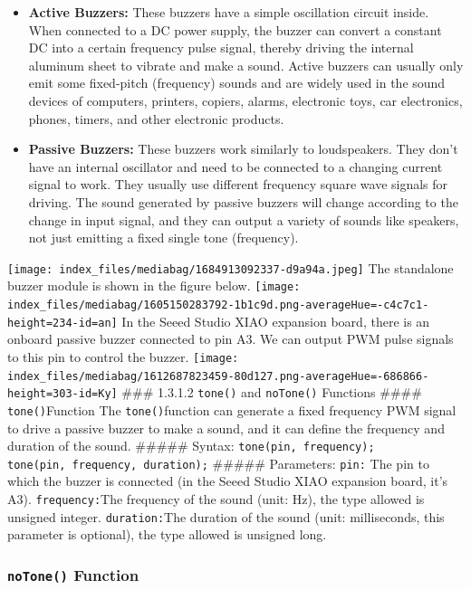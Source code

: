 \documentclass[
  letterpaper,
  DIV=11,
  numbers=noendperiod]{scrreprt}
\providecommand{\tightlist}{%
  \setlength{\itemsep}{0pt}\setlength{\parskip}{0pt}}\usepackage{longtable,booktabs,array}
\begin{document}
\begin{itemize}
\tightlist
\item
  \textbf{Active Buzzers:} These buzzers have a simple oscillation
  circuit inside. When connected to a DC power supply, the buzzer can
  convert a constant DC into a certain frequency pulse signal, thereby
  driving the internal aluminum sheet to vibrate and make a sound.
  Active buzzers can usually only emit some fixed-pitch (frequency)
  sounds and are widely used in the sound devices of computers,
  printers, copiers, alarms, electronic toys, car electronics, phones,
  timers, and other electronic products.
\item
  \textbf{Passive Buzzers:} These buzzers work similarly to
  loudspeakers. They don't have an internal oscillator and need to be
  connected to a changing current signal to work. They usually use
  different frequency square wave signals for driving. The sound
  generated by passive buzzers will change according to the change in
  input signal, and they can output a variety of sounds like speakers,
  not just emitting a fixed single tone (frequency).
\end{itemize}

\texttt{[image: index\_files/mediabag/1684913092337-d9a94a.jpeg]} The
standalone buzzer module is shown in the figure below.
\texttt{[image: index\_files/mediabag/1605150283792-1b1c9d.png-averageHue=-c4c7c1-height=234-id=an]}
In the Seeed Studio XIAO expansion board, there is an onboard passive
buzzer connected to pin A3. We can output PWM pulse signals to this pin
to control the buzzer.
\texttt{[image: index\_files/mediabag/1612687823459-80d127.png-averageHue=-686866-height=303-id=Ky]}
\#\#\# 1.3.1.2 \texttt{tone()} and \texttt{noTone()} Functions \#\#\#\#
\texttt{tone()}Function The \texttt{tone()}function can generate a fixed
frequency PWM signal to drive a passive buzzer to make a sound, and it
can define the frequency and duration of the sound. \#\#\#\#\# Syntax:
\texttt{tone(pin,\ frequency);}
\texttt{tone(pin,\ frequency,\ duration);} \#\#\#\#\# Parameters:
\texttt{pin:} The pin to which the buzzer is connected (in the Seeed
Studio XIAO expansion board, it's A3). \texttt{frequency:}The frequency
of the sound (unit: Hz), the type allowed is unsigned integer.
\texttt{duration:}The duration of the sound (unit: milliseconds, this
parameter is optional), the type allowed is unsigned long.

\hypertarget{notone-function}{%
\subsubsection*{\texorpdfstring{\texttt{noTone()}
Function}{noTone() Function}}\label{notone-function}}
\end{document}
